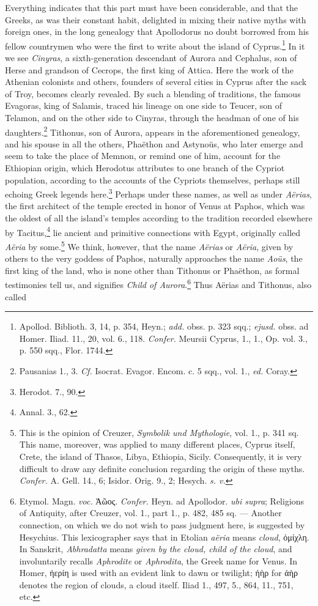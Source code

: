 \documentclass[a4paper, 11pt, oneside, polutonikogreek, english]{article}
\begin{document}
Everything indicates that this part must have been considerable, and that the Greeks, as was their constant habit, delighted in mixing their native myths with foreign ones, in the long genealogy that Apollodorus no doubt borrowed from his fellow countrymen who were the first to write about the island of Cyprus.\footnote{Apollod. Biblioth. 3, 14, p. 354, Heyn.; \emph{add.} obss. p. 323 sqq.; \emph{ejusd.} obss. ad Homer. Iliad. 11., 20, vol. 6., 118. \emph{Confer.}  Meursii Cyprus, 1., 1., Op. vol. 3., p. 550 sqq., Flor. 1744.} In it we see \emph{Cinyras}, a sixth-generation descendant of Aurora and Cephalus, son of Herse and grandson of Cecrops, the first king of Attica. Here the work of the Athenian colonists and others, founders of several cities in Cyprus after the sack of Troy, becomes clearly revealed. By such a blending of traditions, the famous Evagoras, king of Salamis, traced his lineage on one side to Teucer, son of Telamon, and on the other side to Cinyras, through the headman of one of his daughters.\footnote{Pausanias 1., 3. \emph{Cf.} Isocrat. Evagor. Encom. c. 5 sqq., vol. 1., \emph{ed.} Coray.} Tithonus, son of Aurora, appears in the aforementioned genealogy, and his spouse in all the others, Phaëthon and Astynoüs, who later emerge and seem to take the place of Memnon, or remind one of him, account for the Ethiopian origin, which Herodotus attributes to one branch of the Cypriot population, according to the accounts of the Cypriots themselves, perhaps still echoing Greek legends here.\footnote{Herodot. 7., 90.} Perhaps under these names, as well as under \emph{Aërias}, the first architect of the temple erected in honor of Venus at Paphos, which was the oldest of all the island's temples according to the tradition recorded elsewhere by Tacitus,\footnote{Annal. 3., 62.} lie ancient and primitive connections with Egypt, originally called \emph{Aëria} by some.\footnote{This is the opinion of Creuzer, \emph{Symbolik und Mythologie}, vol. 1., p. 341 sq. This name, moreover, was applied to many different places, Cyprus itself, Crete, the island of Thasos, Libya, Ethiopia, Sicily. Consequently, it is very difficult to draw any definite conclusion regarding the origin of these myths. \emph{Confer.} A. Gell. 14., 6; Isidor. Orig. 9., 2; Hesych. \emph{s. v.}} We think, however, that the name \emph{Aërias} or \emph{Aëria}, given by others to the very goddess of Paphos, naturally approaches the name \emph{Aoüs}, the first king of the land, who is none other than Tithonus or Phaëthon, as formal testimonies tell us, and signifies \emph{Child of Aurora}.\footnote{Etymol. Magn. \emph{voc.} Ἀῶος. \emph{Confer.} Heyn. ad Apollodor. \emph{ubi supra}; Religions of Antiquity, after Creuzer, vol. 1., part 1., p. 482, 485 sq. --- Another connection, on which we do not wish to pass judgment here, is suggested by Hesychius. This lexicographer says that in Etolian \emph{aëria} means \emph{cloud}, ὀμίχλη. In Sanskrit, \emph{Abhradatta} means \emph{given by the cloud, child of the cloud}, and involuntarily recalls \emph{Aphrodite} or \emph{Aphrodita}, the Greek name for Venus. In Homer, ἠερίη is used with an evident link to dawn or twilight; ἠὴρ for ἀὴρ denotes the region of clouds, a cloud itself. Iliad 1., 497, 5., 864, 11., 751, etc.} Thus Aërias and Tithonus, also called 
\end{document}
